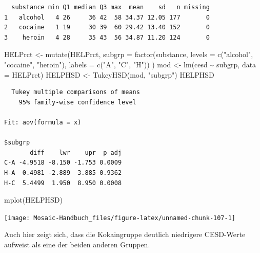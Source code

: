 \documentclass[
  ngerman,
]{scrbook}
\newenvironment{Shaded}{\begin{snugshade}}{\end{snugshade}}
\newcommand{\AttributeTok}[1]{\textcolor[rgb]{0.77,0.63,0.00}{#1}}
\newcommand{\FunctionTok}[1]{\textcolor[rgb]{0.00,0.00,0.00}{#1}}
\newcommand{\NormalTok}[1]{#1}
\newcommand{\OtherTok}[1]{\textcolor[rgb]{0.56,0.35,0.01}{#1}}
\newcommand{\SpecialCharTok}[1]{\textcolor[rgb]{0.00,0.00,0.00}{#1}}
\newcommand{\StringTok}[1]{\textcolor[rgb]{0.31,0.60,0.02}{#1}}
\begin{document}
\begin{verbatim}
  substance min Q1 median Q3 max  mean    sd   n missing
1   alcohol   4 26     36 42  58 34.37 12.05 177       0
2   cocaine   1 19     30 39  60 29.42 13.40 152       0
3    heroin   4 28     35 43  56 34.87 11.20 124       0
\end{verbatim}

\begin{Shaded}
\begin{Highlighting}[]
\NormalTok{HELPrct }\OtherTok{\textless{}{-}} \FunctionTok{mutate}\NormalTok{(HELPrct, }
                  \AttributeTok{subgrp =} \FunctionTok{factor}\NormalTok{(substance, }
                                  \AttributeTok{levels =} \FunctionTok{c}\NormalTok{(}\StringTok{"alcohol"}\NormalTok{, }\StringTok{"cocaine"}\NormalTok{, }\StringTok{"heroin"}\NormalTok{), }
                                  \AttributeTok{labels =} \FunctionTok{c}\NormalTok{(}\StringTok{"A"}\NormalTok{, }\StringTok{"C"}\NormalTok{, }\StringTok{"H"}\NormalTok{))}
\NormalTok{                  )}
\NormalTok{mod }\OtherTok{\textless{}{-}} \FunctionTok{lm}\NormalTok{(cesd }\SpecialCharTok{\textasciitilde{}}\NormalTok{ subgrp, }\AttributeTok{data =}\NormalTok{ HELPrct)}
\NormalTok{HELPHSD }\OtherTok{\textless{}{-}} \FunctionTok{TukeyHSD}\NormalTok{(mod, }\StringTok{"subgrp"}\NormalTok{)}
\NormalTok{HELPHSD}
\end{Highlighting}
\end{Shaded}

\begin{verbatim}
  Tukey multiple comparisons of means
    95% family-wise confidence level

Fit: aov(formula = x)

$subgrp
       diff    lwr    upr  p adj
C-A -4.9518 -8.150 -1.753 0.0009
H-A  0.4981 -2.889  3.885 0.9362
H-C  5.4499  1.950  8.950 0.0008
\end{verbatim}

\begin{Shaded}
\begin{Highlighting}[]
\FunctionTok{mplot}\NormalTok{(HELPHSD)}
\end{Highlighting}
\end{Shaded}

\begin{center}\texttt{[image: Mosaic-Handbuch\_files/figure-latex/unnamed-chunk-107-1]} \end{center}

Auch hier zeigt sich, dass die Kokaingruppe deutlich niedrigere CESD-Werte aufweist als eine der beiden anderen Gruppen.
\end{document}
